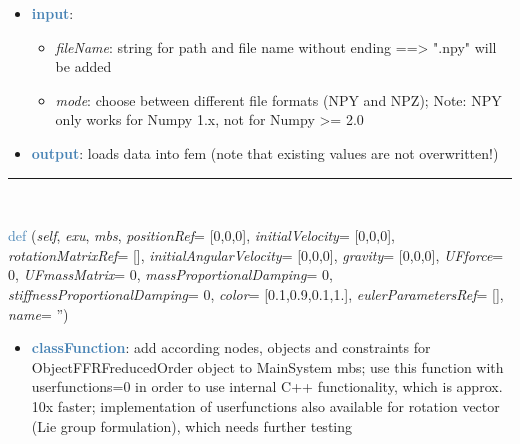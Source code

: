 \begin{itemize}[leftmargin=1.4cm]
\begin{itemize}[leftmargin=1.4cm]
\begin{itemize}[leftmargin=1.4cm]
\begin{itemize}[leftmargin=0.5cm]
\begin{itemize}[leftmargin=1.4cm]
\begin{itemize}[leftmargin=1.4cm]
\begin{itemize}[leftmargin=1.4cm]
\begin{itemize}[leftmargin=0.5cm]
\begin{itemize}[leftmargin=0.7cm]
\begin{itemize}[leftmargin=1.2cm]
\setlength{\itemindent}{-0.7cm}
\item[]load all data (nodes, elements, ...) from a data filename previously stored with SaveToFile(...).
\item[]this function is much faster than the text-based import functions
\end{itemize}
\item[--]\textcolor{steelblue}{\bf input}: \vspace{-6pt}
\begin{itemize}[leftmargin=1.2cm]
\setlength{\itemindent}{-0.7cm}
\item[]{\it fileName}: string for path and file name without ending ==> ".npy" will be added
\item[]{\it mode}: choose between different file formats (NPY and NPZ); Note: NPY only works for Numpy 1.x, not for Numpy >= 2.0
\end{itemize}
\item[--]\textcolor{steelblue}{\bf output}: loads data into fem (note that existing values are not overwritten!)
\vspace{12pt}\end{itemize}
%
\noindent\rule{8cm}{0.75pt}\vspace{1pt} \\ 
\begin{flushleft}
\noindent \textcolor{steelblue}{def {\bf {}}}\label{sec:FEM:ObjectFFRFreducedOrderInterface:AddObjectFFRFreducedOrderWithUserFunctions}
({\it self}, {\it exu}, {\it mbs}, {\it positionRef}= [0,0,0], {\it initialVelocity}= [0,0,0], {\it rotationMatrixRef}= [], {\it initialAngularVelocity}= [0,0,0], {\it gravity}= [0,0,0], {\it UFforce}= 0, {\it UFmassMatrix}= 0, {\it massProportionalDamping}= 0, {\it stiffnessProportionalDamping}= 0, {\it color}= [0.1,0.9,0.1,1.], {\it eulerParametersRef}= [], {\it name}= '')
\end{flushleft}
\setlength{\itemindent}{0.7cm}
\begin{itemize}[leftmargin=0.7cm]
\item[--]\textcolor{steelblue}{\bf classFunction}: add according nodes, objects and constraints for ObjectFFRFreducedOrder object to MainSystem mbs; use this function with userfunctions=0 in order to use internal C++ functionality, which is approx. 10x faster; implementation of userfunctions also available for rotation vector (Lie group formulation), which needs further testing

\end{itemize}
\end{itemize}
\end{itemize}
\end{itemize}
\end{itemize}
\end{itemize}
\end{itemize}
\end{itemize}
\end{itemize}
